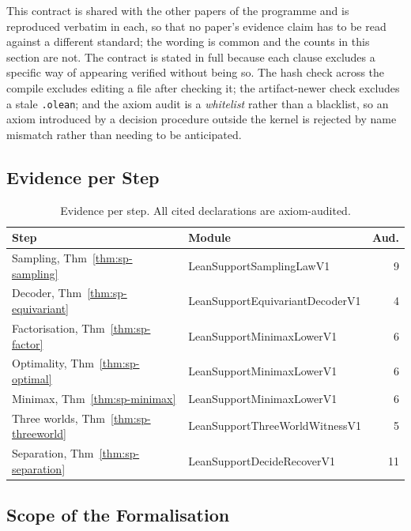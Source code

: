 \documentclass[conference]{IEEEtran}
\theoremstyle{definition}
\newcommand{\lean}[1]{\textsf{\footnotesize #1}}
\begin{document}
This contract is shared with the other papers of the programme and is reproduced verbatim in
each, so that no paper's evidence claim has to be read against a different standard; the
wording is common and the counts in this section are not. The contract is stated in full
because each clause excludes a specific way of appearing verified without being so. The hash check across the compile excludes editing a file after
checking it; the artifact-newer check excludes a stale \texttt{.olean}; and the axiom audit is
a \emph{whitelist} rather than a blacklist, so an axiom introduced by a decision procedure
outside the kernel is rejected by name mismatch rather than needing to be anticipated.

\subsection{Evidence per Step}

\begin{table}[htbp]
\caption{Evidence per step. All cited declarations are axiom-audited.}
\label{tab:sp-inventory}
\centering\footnotesize\setlength{\tabcolsep}{3pt}
\begin{tabular}{@{}llr@{}}
\toprule
Step & Module & Aud. \\
\midrule
Sampling, Thm~\ref{thm:sp-sampling}      & \lean{LeanSupportSamplingLawV1}        & 9 \\
Decoder, Thm~\ref{thm:sp-equivariant}    & \lean{LeanSupportEquivariantDecoderV1} & 4 \\
Factorisation, Thm~\ref{thm:sp-factor}   & \lean{LeanSupportMinimaxLowerV1}       & 6 \\
Optimality, Thm~\ref{thm:sp-optimal}     & \lean{LeanSupportMinimaxLowerV1}       & 6 \\
Minimax, Thm~\ref{thm:sp-minimax}        & \lean{LeanSupportMinimaxLowerV1}       & 6 \\
Three worlds, Thm~\ref{thm:sp-threeworld}& \lean{LeanSupportThreeWorldWitnessV1}  & 5 \\
Separation, Thm~\ref{thm:sp-separation}  & \lean{LeanSupportDecideRecoverV1}      & 11 \\
\bottomrule
\end{tabular}
\end{table}

\subsection{Scope of the Formalisation}
\end{document}
